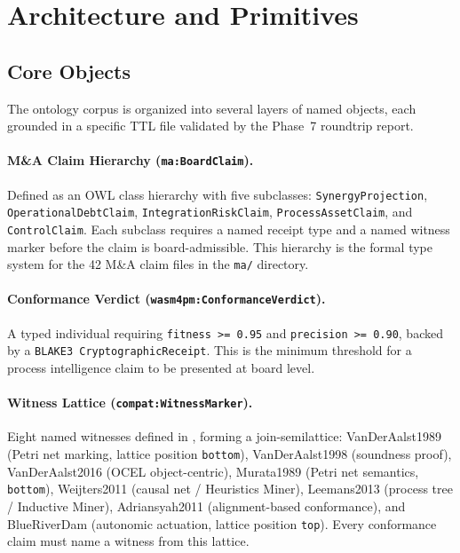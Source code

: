 
\section{Architecture and Primitives}
\label{sec:research-open-ontologies-architecture}

\subsection{Core Objects}
\label{sec:research-open-ontologies-core-objects}

The ontology corpus is organized into several layers of named objects, each grounded in a
specific TTL file validated by the Phase~7 roundtrip report.

\paragraph{M\&A Claim Hierarchy (\texttt{ma:BoardClaim}).}
Defined as an OWL class hierarchy with five subclasses: \texttt{SynergyProjection},
\texttt{OperationalDebtClaim}, \texttt{IntegrationRiskClaim}, \texttt{ProcessAssetClaim},
and \texttt{ControlClaim}. Each subclass requires a named receipt type and a named witness
marker before the claim is board-admissible. This hierarchy is the formal type system for
the 42 M\&A claim files in the \texttt{ma/} directory.

\paragraph{Conformance Verdict (\texttt{wasm4pm:ConformanceVerdict}).}
A typed individual requiring \texttt{fitness >= 0.95} and \texttt{precision >= 0.90},
backed by a \texttt{BLAKE3 CryptographicReceipt}. This is the minimum threshold for a
process intelligence claim to be presented at board level.

\paragraph{Witness Lattice (\texttt{compat:WitnessMarker}).}
Eight named witnesses defined in , forming a join-semilattice:
VanDerAalst1989 (Petri net marking, lattice position \texttt{bottom}), VanDerAalst1998
(soundness proof), VanDerAalst2016 (OCEL object-centric), Murata1989 (Petri net semantics,
\texttt{bottom}), Weijters2011 (causal net / Heuristics Miner), Leemans2013 (process tree /
Inductive Miner), Adriansyah2011 (alignment-based conformance), and BlueRiverDam (autonomic
actuation, lattice position \texttt{top}). Every conformance claim must name a witness from
this lattice.

